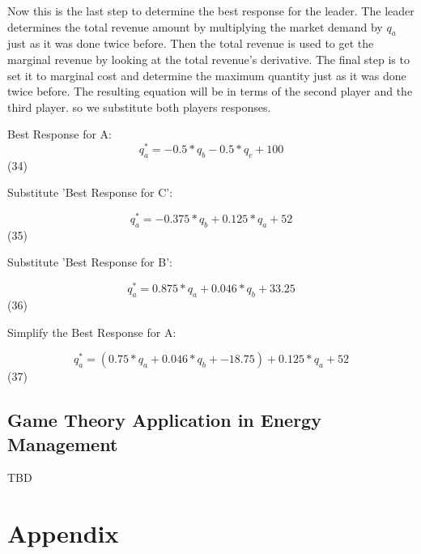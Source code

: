 \documentclass[phd, 12pt, print]{fauthesis}
\begin{document}
Now this is the last step to determine the best response for the leader.
The leader determines the total revenue amount by 
multiplying the market demand by $q_{a}$ just as it was done twice before.
Then the total revenue is used to get the marginal revenue by looking at 
the total revenue's derivative. The final step is to set it to marginal cost
and determine the maximum quantity just as it was done twice before. 
The resulting equation will be in terms of the second player and the third player.
so we substitute both players responses. 

Best Response for A:
$$ q_{a}^* = -0.5*q_{b} -0.5*q_{c} + 100$$ (34)

Substitute 'Best Response for C':

$$ q_{a}^* =  -0.375*q_{b} + 0.125*q_{a}  + 52$$ (35)

Substitute 'Best Response for B':

$$ q_{a}^* = 0.875*q_{a} + 0.046*q_{b} + 33.25$$ (36)

Simplify the Best Response for A:

$$ q_{a}^* =  (0.75*q_{a} +0.046*q_{b} + -18.75) + 0.125*q_{a}  + 52$$ (37)

\section{Game Theory Application in Energy Management}

TBD


\backmatter

\chapter{Appendix}
\end{document}
